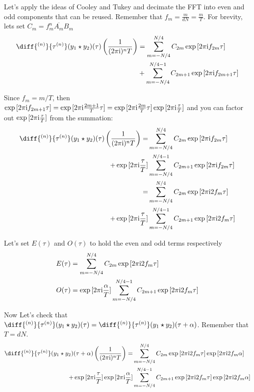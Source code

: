 \documentclass[12pt]{article}
\newenvironment{derivation}[1][Derivation]{\begin{trivlist}
\item[\hskip \labelsep {\bfseries #1:}]}{\end{trivlist}}
\begin{document}
\begin{derivation}
Let's apply the ideas of Cooley and Tukey and decimate the FFT into even and odd components that can be reused. Remember that $f_m = \frac{m}{dN} = \frac{m}{T}$. For brevity, lets set $C_m = f_m^n \overline{A_m} B_m $
\begin{align}
\diff{^{(n)}}{\tau^{(n)}} (y_1 \star y_2)(\tau) \left(\frac{1}{(\twopii)^{n} T}\right) & = \sum_{m = -N/4}^{N/4} C_{2m} \exp{[\twopii f_{2m} \tau]} \\
& + \sum_{m = -N/4}^{N/4-1} C_{2m+1} \exp{[\twopii f_{2m+1} \tau]} \\
\end{align}

Since $f_m=m/T$, then $\exp{[2 \pi\mathrm{i}f_{2m+1} \tau]} = \exp{[2 \pi\mathrm{i}\frac{2m+1}{T} \tau]} = \exp{[2 \pi\mathrm{i}\frac{2m}{T} \tau]} \exp{[2 \pi\mathrm{i}\frac{\tau}{T}]} $ and you can factor out $\exp{[2 \pi\mathrm{i}\frac{\tau}{T}]}$ from the summation:
\begin{align}
\diff{^{(n)}}{\tau^{(n)}} (y_1 \star y_2)(\tau) \left(\frac{1}{(\twopii)^{n} T}\right) = & \sum_{m = -N/4}^{N/4} C_{2m} \exp{[\twopii f_{2m} \tau]} \\
+ \exp{[\twopii \frac{\tau}{T}]} & \sum_{m = -N/4}^{N/4-1} C_{2m+1} \exp{[\twopii f_{2m} \tau]} \\
= & \sum_{m = -N/4}^{N/4} C_{2m} \exp{[\twopii 2 f_m \tau]} \\
+ \exp{[\twopii \frac{\tau}{T}]} & \sum_{m = -N/4}^{N/4-1} C_{2m+1} \exp{[\twopii 2 f_m \tau]}
\end{align}

Let's set $E(\tau)$ and $O(\tau)$ to hold the even and odd terms respectively
\begin{align}
E(\tau) & = \sum_{m = -N/4}^{N/4} C_{2m} \exp{[2 \pi\mathrm{i}2 f_m \tau]} \\
O(\tau) & = \exp{[2 \pi\mathrm{i}\frac{\alpha}{T}]} \sum_{m = -N/4}^{N/4-1} C_{2m+1} \exp{[2 \pi\mathrm{i}2 f_m \tau]}
\end{align}


Now Let's check that  $\diff{^{(n)}}{\tau^{(n)}} (y_1 \star y_2)(\tau) = \diff{^{(n)}}{\tau^{(n)}} (y_1 \star y_2)(\tau+\alpha)$. Remember that $T = dN$.
\begin{align}
\diff{^{(n)}}{\tau^{(n)}} (y_1 \star y_2)(\tau+\alpha) \left(\frac{1}{(\twopii)^{n} T}\right)
= & \sum_{m = -N/4}^{N/4} C_{2m} \exp{[\twopii 2 f_m \tau]} \exp{[\twopii 2 f_m \alpha]} \\
+ \exp{[\twopii \frac{\tau}{T}]} \exp{[\twopii \frac{\alpha}{T}]} & \sum_{m = -N/4}^{N/4-1} C_{2m+1} \exp{[\twopii 2 f_m \tau]} \exp{[\twopii 2 f_m \alpha]}
\end{align}


\end{derivation}
\end{document}
